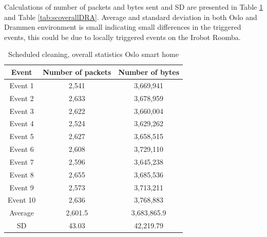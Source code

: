 Calculations of number of packets and bytes sent and \gls{SD} are presented in Table \ref{tab:scoverall} and Table \ref{tab:scoverallDRA}. Average and standard deviation in both Oslo and Drammen environment is small indicating small differences in the triggered events, this could be due to locally triggered events on the Irobot Roomba. 

\begin{table}[H]
\centering
\caption{Scheduled cleaning, overall statistics Oslo smart home}
\label{tab:scoverall}
\begin{tabular}{|c|c|c|}
\hline
\textbf{Event} & \textbf{Number of packets} & \textbf{Number of bytes} \\ \hline
Event 1        & 2,541                   & 3,669,941                   \\ \hline
Event 2        & 2,633                   & 3,678,959                   \\ \hline
Event 3        & 2,622                   & 3,660,004                   \\ \hline
Event 4        & 2,524                   & 3,629,262                   \\ \hline
Event 5        & 2,627                   & 3,658,515                   \\ \hline
Event 6        & 2,608                   & 3,729,110                   \\ \hline
Event 7        & 2,596                   & 3,645,238                   \\ \hline
Event 8        & 2,655                   & 3,685,536                   \\ \hline
Event 9        & 2,573                   & 3,713,211                   \\ \hline
Event 10       & 2,636                   & 3,768,883                   \\ \hline
Average        & 2,601.5                 & 3,683,865.9                 \\ \hline
SD       & 43.03       & 42,219.79               \\ \hline
\end{tabular}
\end{table}

